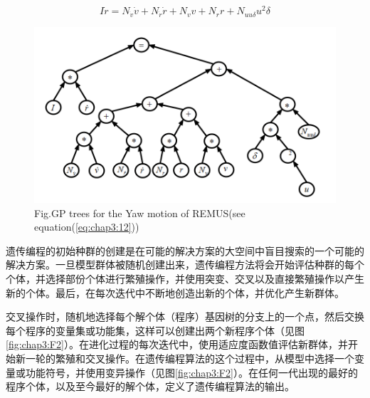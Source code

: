 \begin{equation}
\label{eq:chap3:12}
 I\dot r = {N_{\dot v}}\dot v + {N_{\dot r}}\dot r + {N_v}v + {N_r}r + {N_{uu\delta }}{u^2}\delta
\end{equation}

\begin{figure}[!htp]
  \centering
  \includegraphics[width=14cm]{figure/chap3/gptrees.png}
  \label{fig:chap3:F1}
   {Fig.}{GP trees for the Yaw motion of REMUS(see equation(\ref{eq:chap3:12})) }
\end{figure}


遗传编程的初始种群的创建是在可能的解决方案的大空间中盲目搜索的一个可能的解决方案。一旦模型群体被随机创建出来，遗传编程方法将会开始评估种群的每个个体，并选择部份个体进行繁殖操作，并使用突变、交叉以及直接繁殖操作以产生新的个体。最后，在每次迭代中不断地创造出新的个体，并优化产生新群体\cite{Gandomi2012A2,stoutemyer2013can}。

交叉操作时，随机地选择每个解个体（程序）基因树的分支上的一个点，然后交换每个程序的变量集或功能集，这样可以创建出两个新程序个体（见图\ref{fig:chap3:F2}）。在进化过程的每次迭代中，使用适应度函数值评估新群体，并开始新一轮的繁殖和交叉操作。在遗传编程算法的这个过程中，从模型中选择一个变量或功能符号，并使用变异操作（见图\ref{fig:chap3:F2}）。在任何一代出现的最好的程序个体，以及至今最好的解个体，定义了遗传编程算法的输出\cite{Gandomi2012A1,schmidt2010symbolic}。

